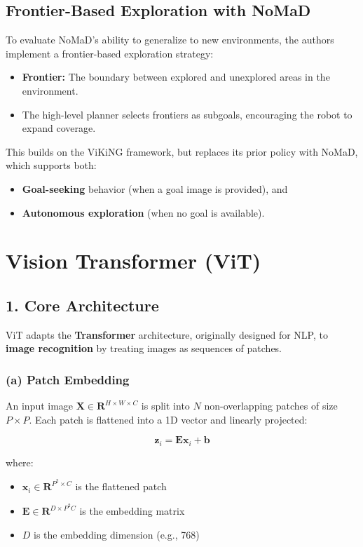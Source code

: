 \documentclass[12pt]{article}
\begin{document}
\begin{appendices}
\subsection*{Frontier-Based Exploration with NoMaD}
To evaluate NoMaD's ability to generalize to new environments, the authors implement a frontier-based exploration strategy:
\begin{itemize} 
    \item \textbf{Frontier:} The boundary between explored and unexplored areas in the environment. 
    \item The high-level planner selects frontiers as subgoals, encouraging the robot to expand coverage. 
\end{itemize}
This builds on the ViKiNG framework, but replaces its prior policy with NoMaD, which supports both: 
\begin{itemize} 
    \item \textbf{Goal-seeking} behavior (when a goal image is provided), and 
    \item \textbf{Autonomous exploration} (when no goal is available). 
\end{itemize}
\section{Vision Transformer (ViT)}

\subsection*{1. Core Architecture}
ViT adapts the \textbf{Transformer} architecture, originally designed for NLP, to \textbf{image recognition} by treating images as sequences of patches.

\subsubsection*{(a) Patch Embedding}
An input image $\mathbf{X} \in \mathbf{R}^{H \times W \times C}$ is split into $N$ non-overlapping patches of size $P \times P$. Each patch is flattened into a 1D vector and linearly projected:

\[
\mathbf{z}_i = \mathbf{E} \mathbf{x}_i + \mathbf{b}
\]

where:
\begin{itemize}
    \item $\mathbf{x}_i \in \mathbf{R}^{P^2 \times C}$ is the flattened patch
    \item $\mathbf{E} \in \mathbf{R}^{D \times P^2 C}$ is the embedding matrix
    \item $D$ is the embedding dimension (e.g., 768)
\end{itemize}


\end{appendices}
\end{document}
